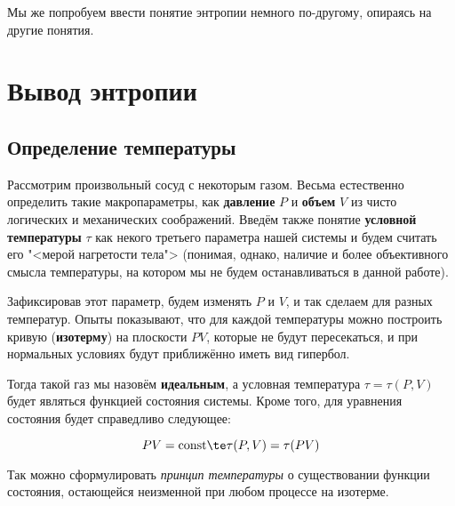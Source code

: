 \documentclass[12pt]{kiarticle}
\newcommand{\co}{\ensuremath{\mathrm{const}}}
\begin{document}
Мы же попробуем ввести понятие энтропии немного по-другому, опираясь на другие понятия.

\section{Вывод энтропии}

\subsection{Определение температуры}

Рассмотрим произвольный сосуд с некоторым газом. Весьма естественно определить такие макропараметры, как \textbf{давление} $ P $ и \textbf{объем} $ V $ из чисто логических и механических соображений. Введём также понятие \textbf{условной температуры} $ \tau $ как некого третьего параметра нашей системы и будем считать его "<мерой нагретости тела"> (понимая, однако, наличие и более объективного смысла температуры, на котором мы не будем останавливаться в данной работе). 

Зафиксировав этот параметр, будем изменять $ P $ и $ V $, и так сделаем для разных температур. Опыты показывают, что для каждой температуры можно построить кривую (\textbf{изотерму}) на плоскости $ PV $, которые не будут пересекаться, и при нормальных условиях будут приближённо иметь вид гипербол. 

Тогда такой газ мы назовём \textbf{идеальным}, а условная температура $ \tau = \tau (P, V) $ будет являться функцией состояния системы. Кроме того, для уравнения состояния будет справедливо следующее:

\begin{equation}\label{}
PV = \co \te \tau (P, V) = \tau (PV)
\end{equation}

Так можно сформулировать \textit{принцип температуры} о существовании функции состояния, остающейся неизменной при любом процессе на изотерме.











%
%	
%	
\end{document}
